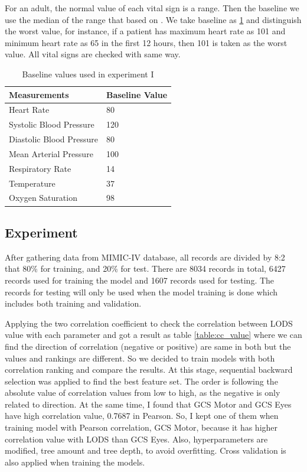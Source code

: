 \documentclass[12pt,a4paper,english
]{tunithesis}
\begin{document}
For an adult, the normal value of each vital sign is a range. Then the baseline we use the median of the range that based on \textcite{medlineplus, johnsh, torp2023, yalemed}. We take baseline as \ref{table:baseline_value} and distinguish the worst value, for instance, if a patient has maximum heart rate as 101 and minimum heart rate as 65 in the first 12 hours, then 101 is taken as the worst value. All vital signs are checked with same way.
\begin{table}[]
\centering
    \caption{Baseline values used in experiment I}
    \label{table:baseline_value}
    \begin{tabular}{|l|l|}
        \hline
        \textbf{Measurements} & \textbf{Baseline Value}\\ \hline
            Heart Rate& 80                \\ \hline
            Systolic Blood Pressure& 120               \\ \hline
            Diastolic Blood Pressure& 80                \\ \hline
            Mean Arterial Pressure& 100               \\ \hline
            Respiratory Rate& 14\\ \hline
            Temperature& 37\\ \hline
            Oxygen Saturation& 98                \\\hline
    \end{tabular}
\end{table}

\subsection{Experiment}

After gathering data from MIMIC-IV database, all records are divided by 8:2 that 80\% for training, and 20\% for test. There are 8034 records in total, 6427 records used for training the model and 1607 records used for testing. The records for testing will only be used when the model training is done which includes both training and validation. 

Applying the two correlation coefficient to check the correlation between LODS value with each parameter and got a result as table \ref{table:cc_value} where we can find the direction of correlation (negative or positive) are same in both but the values and rankings are different. So we  decided to train models with both correlation ranking and compare the results. At this stage, sequential backward selection was applied to find the best feature set. The order is following the absolute value of correlation values from low to high, as the negative is only related to direction. At the same time, I found that GCS Motor and GCS Eyes have high correlation value, 0.7687 in Pearson. So, I kept one of them when training model with Pearson correlation, GCS Motor, because it has higher correlation value with LODS than GCS Eyes. Also, hyperparameters are modified, tree amount and tree depth, to avoid overfitting. Cross validation is also applied when training the models.
\end{document}
